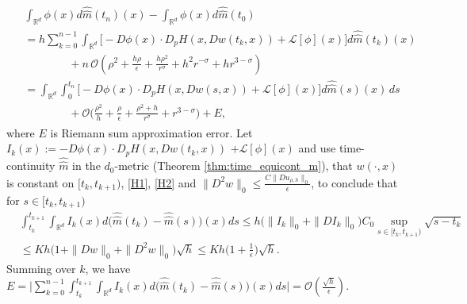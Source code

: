 \documentclass[a4paper,  twoside, 10pt, leqno]{amsart}
\newcommand{\R}{\mathbb{R}}
\newcommand{\rd}{\mathbb{R}^d}
\theoremstyle{remark}
\theoremstyle{definition}
\begin{document}
\begin{align} \label{eq:proof_main_1}
\begin{split}
  &\int_{\rd} \phi(x)d\widehat{\widehat{m}}(t_n)(x)-\int_{\rd}\phi(x) d\widehat{\widehat{m}}(t_0)\\
&= h\sum_{k=0}^{n-1} \int_{\rd} \big[- D\phi(x)\cdot D_p H(x,Dw(t_k,x)) + \mathcal{L}[\phi](x)\big] d\widehat{\widehat{m}}(t_k)(x) \\
 & \qquad \qquad + n \,\mathcal{O} (\rho^2 + \frac{h\rho}{\epsilon} +\frac{h\rho^2}{r^{\sigma}} +h^2r^{-\sigma} + hr^{3-\sigma})\\
 & = \int_{\rd}\int_0^{t_n}  \big[- D\phi(x)\cdot D_p H(x, Dw(s, x)) + \mathcal{L}[\phi](x)\big] d\widehat{\widehat{m}}(s)(x) \, ds\\
& \qquad \qquad + \mathcal{O} \Big(\frac{\rho^2}{h} + \frac{\rho}{\epsilon}+ \frac{\rho^2+h}{r^{\sigma}}+ r^{3-\sigma}\Big) + E,
\end{split}
\end{align}
where $E$ is Riemann sum approximation error. Let $I_k(x):= - D\phi(x)\cdot D_p H(x, Dw(t_k,x))$ $+ \mathcal{L}[\phi](x)$ and use time-continuity $\widehat{\widehat{m}}$ in the $d_0$-metric (Theorem \ref{thm:time_equicont_m}), %
that $w(\cdot,x)$ is constant on $[t_k, t_{k+1})$, \ref{H1}, \ref{H2} and  $\|D^2w\|_{0}\leq \frac{C \|Du_{\rho,h}\|_{0}}{\epsilon}$, to conclude that  for $s\in [t_k, t_{k+1})$  
\begin{align*}
& \int_{t_k}^{t_{k+1}} \int_{\rd}  I_k(x) d\big(\widehat{\widehat{m}}(t_k) - \widehat{\widehat{m}}(s)\big)(x) ds \leq h \big(\|I_k\|_{0} + \|DI_k\|_{0}\big) C_0 \sup_{s\in[t_k,t_{k+1})} \sqrt{s-t_k} \\
&\leq K h \Big( 1 + \|Dw\|_{0} + \|D^2w\|_{0} \Big)   \sqrt{h} \leq K h \Big(1+ \frac{1}{\epsilon}\Big) \sqrt{h}.
\end{align*}
Summing over $k$, we have $E= \big| \sum_{k=0}^{n-1}\int_{t_k}^{t_{k+1}} \int_{\rd}  I_k(x) d\big(\widehat{\widehat{m}}(t_k) - \widehat{\widehat{m}}(s)\big)(x) ds\big| = \mathcal O(\frac{\sqrt h}{\epsilon})$.
\end{document}
